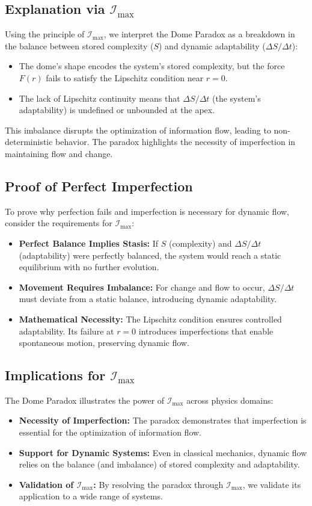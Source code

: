 \documentclass[12pt]{article}
\begin{document}
\subsection{Explanation via $\mathcal{I}_{\text{max}}$}
Using the principle of $\mathcal{I}_{\text{max}}$, we interpret the Dome Paradox as a breakdown in the balance between stored complexity ($S$) and dynamic adaptability ($\Delta S / \Delta t$):
\begin{itemize}
    \item The dome's shape encodes the system's stored complexity, but the force $F(r)$ fails to satisfy the Lipschitz condition near $r = 0$.
    \item The lack of Lipschitz continuity means that $\Delta S / \Delta t$ (the system's adaptability) is undefined or unbounded at the apex.
\end{itemize}
This imbalance disrupts the optimization of information flow, leading to non-deterministic behavior. The paradox highlights the necessity of imperfection in maintaining flow and change.

\subsection{Proof of Perfect Imperfection}
To prove why perfection fails and imperfection is necessary for dynamic flow, consider the requirements for $\mathcal{I}_{\text{max}}$:
\begin{itemize}
    \item \textbf{Perfect Balance Implies Stasis:} If $S$ (complexity) and $\Delta S / \Delta t$ (adaptability) were perfectly balanced, the system would reach a static equilibrium with no further evolution.
    \item \textbf{Movement Requires Imbalance:} For change and flow to occur, $\Delta S / \Delta t$ must deviate from a static balance, introducing dynamic adaptability.
    \item \textbf{Mathematical Necessity:} The Lipschitz condition ensures controlled adaptability. Its failure at $r = 0$ introduces imperfections that enable spontaneous motion, preserving dynamic flow.
\end{itemize}

\subsection{Implications for $\mathcal{I}_{\text{max}}$}
The Dome Paradox illustrates the power of $\mathcal{I}_{\text{max}}$ across physics domains:
\begin{itemize}
    \item \textbf{Necessity of Imperfection:} The paradox demonstrates that imperfection is essential for the optimization of information flow.
    \item \textbf{Support for Dynamic Systems:} Even in classical mechanics, dynamic flow relies on the balance (and imbalance) of stored complexity and adaptability.
    \item \textbf{Validation of $\mathcal{I}_{\text{max}}$:} By resolving the paradox through $\mathcal{I}_{\text{max}}$, we validate its application to a wide range of systems.
\end{itemize}
\end{document}
